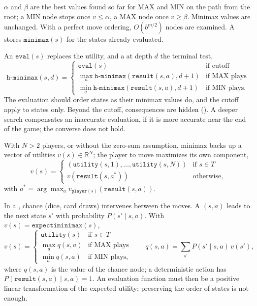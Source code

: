 \documentclass[11pt, a4paper]{exam}
\begin{document}
\begin{recap}
    $\alpha$ and $\beta$ are the best values found so far for MAX and MIN on the path from the root; a MIN node stops once $v \leq \alpha$, a MAX node once $v \geq \beta$. Minimax values are unchanged. With a perfect move ordering, $O(b^{m/2})$ nodes are examined. A  stores $\texttt{minimax}(s)$ for the states already evaluated.

    An  $\texttt{eval}(s)$ replaces the utility, and a  at depth $d$ the terminal test,
    \[
        \texttt{h-minimax}(s, d) = \begin{cases}
            \texttt{eval}(s) & \text{if cutoff} \\
            \max_{a} \texttt{h-minimax}(\texttt{result}(s, a), d + 1) & \text{if MAX plays} \\
            \min_{a} \texttt{h-minimax}(\texttt{result}(s, a), d + 1) & \text{if MIN plays.}
        \end{cases}
    \]
    The evaluation should order states as their minimax values do, and the cutoff apply to  states only. Beyond the cutoff, consequences are hidden (). A deeper search compensates an inaccurate evaluation, if it is more accurate near the end of the game; the converse does not hold.

    With $N > 2$ players, or without the zero-sum assumption, minimax backs up a vector of utilities $v(s) \in \mathbb{R}^N$; the player to move maximizes its own component,
    \[
        v(s) = \begin{cases}
            \left(\texttt{utility}(s, 1), \ldots, \texttt{utility}(s, N)\right) & \text{if } s \in T \\
            v(\texttt{result}(s, a^*)) & \text{otherwise,}
        \end{cases}
    \]
    with $a^* = \arg\max_a v_{\texttt{player}(s)}(\texttt{result}(s, a))$.

    In a , chance (dice, card draws) intervenes between the moves. A  $(s, a)$ leads to the next state $s'$ with probability $P(s' \mid s, a)$. With $v(s) = \texttt{expectiminimax}(s)$,
    \[
        v(s) = \begin{cases}
            \texttt{utility}(s) & \text{if } s \in T \\
            \max_a q(s, a) & \text{if MAX plays} \\
            \min_a q(s, a) & \text{if MIN plays,}
        \end{cases}
        \qquad q(s, a) = \sum_{s'} P(s' \mid s, a) \, v(s'),
    \]
    where $q(s, a)$ is the value of the chance node; a deterministic action has $P(\texttt{result}(s, a) \mid s, a) = 1$. An evaluation function must then be a positive linear transformation of the expected utility; preserving the order of states is not enough.


\end{recap}
\end{document}
